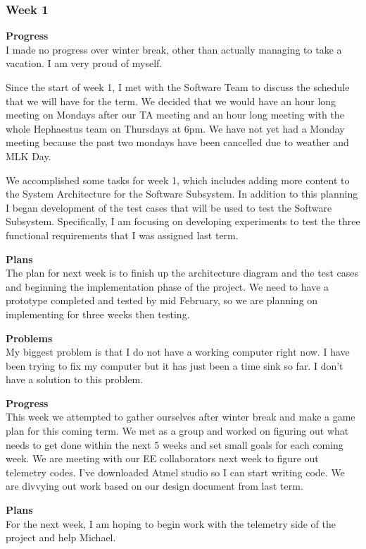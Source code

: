 \subsubsection{Week 1}
\textbf{Progress} \\ 
I made no progress over winter break, other than actually managing to take a vacation. I am very proud of myself.

Since the start of week 1, I met with the Software Team to discuss the schedule that we will have for the term. We decided that we would have an hour long meeting on Mondays after our TA meeting and an hour long meeting with the whole Hephaestus team on Thursdays at 6pm. We have not yet had a Monday meeting because the past two mondays have been cancelled due to weather and MLK Day.

We accomplished some tasks for week 1, which includes adding more content to the System Architecture for the Software Subsystem. In addition to this planning I began development of the test cases that will be used to test the Software Subsystem. Specifically, I am focusing on developing experiments to test the three functional requirements that I was assigned last term.

\textbf{Plans} \\ 
The plan for next week is to finish up the architecture diagram and the test cases and beginning the implementation phase of the project. We need to have a prototype completed and tested by mid February, so we are planning on implementing for three weeks then testing.

\textbf{Problems} \\ 
My biggest problem is that I do not have a working computer right now. I have been trying to fix my computer but it has just been a time sink so far. I don't have a solution to this problem.

\textbf{Progress} \\ 
This week we attempted to gather ourselves after winter break and make a game plan for this coming term. We met as a 
group and worked on figuring out what needs to get done within the next 5 weeks and set small goals for each coming 
week. We are meeting with our EE collaborators next week to figure out telemetry codes. I've downloaded Atmel studio 
so I can start writing code. We are divvying out work based on our design document from last term.

\textbf{Plans} \\ 
For the next week, I am hoping to begin work with the telemetry side of the project and help Michael.


